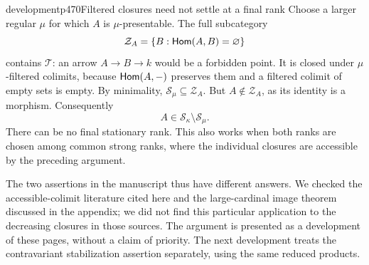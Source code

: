 \begin{dcomment}{development}{p470}{Filtered closures need not settle at a final rank}
Choose a larger regular $\mu$ for which $A$ is $\mu$-presentable. The full subcategory
\[
 \mathcal Z_A=\{B:\mathsf{Hom}(A,B)=\varnothing\}
\]
contains $\mathcal T$: an arrow $A\to B\to k$ would be a forbidden point. It is closed under $\mu$-filtered colimits, because $\mathsf{Hom}(A,-)$ preserves them and a filtered colimit of empty sets is empty. By minimality, $\mathcal S_\mu\subseteq\mathcal Z_A$. But $A\notin\mathcal Z_A$, as its identity is a morphism. Consequently
\[
 A\in\mathcal S_\kappa\setminus\mathcal S_\mu.
\]
There can be no final stationary rank. This also works when both ranks are chosen among common strong ranks, where the individual closures are accessible by the preceding argument.

The two assertions in the manuscript thus have different answers. We checked the accessible-colimit literature cited here and the large-cardinal image theorem discussed in the appendix; we did not find this particular application to the decreasing closures in those sources. The argument is presented as a development of these pages, without a claim of priority. The next development treats the contravariant stabilization assertion separately, using the same reduced products.
\end{dcomment}


